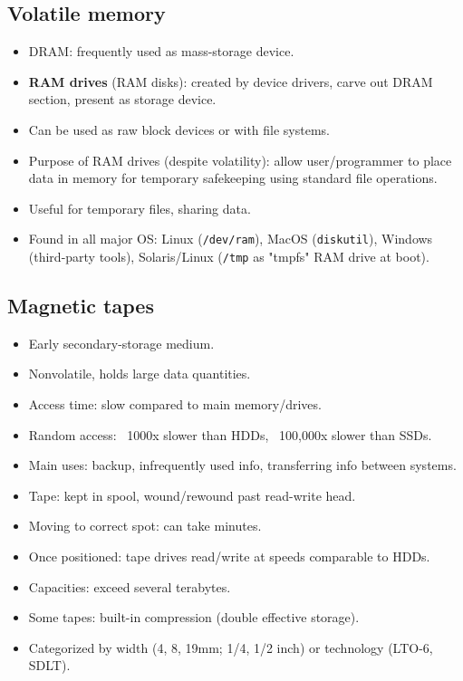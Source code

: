 \subsection{Volatile memory}
\begin{itemize}
    \item DRAM: frequently used as mass-storage device.
    \item \textbf{RAM drives} (RAM disks): created by device drivers, carve out DRAM section, present as storage device.
    \item Can be used as raw block devices or with file systems.
    \item Purpose of RAM drives (despite volatility): allow user/programmer to place data in memory for temporary safekeeping using standard file operations.
    \item Useful for temporary files, sharing data.
    \item Found in all major OS: Linux (\texttt{/dev/ram}), MacOS (\texttt{diskutil}), Windows (third-party tools), Solaris/Linux (\texttt{/tmp} as "tmpfs" RAM drive at boot).
\end{itemize}

\subsection{Magnetic tapes}
\begin{itemize}
    \item Early secondary-storage medium.
    \item Nonvolatile, holds large data quantities.
    \item Access time: slow compared to main memory/drives.
    \item Random access: ~1000x slower than HDDs, ~100,000x slower than SSDs.
    \item Main uses: backup, infrequently used info, transferring info between systems.
    \item Tape: kept in spool, wound/rewound past read-write head.
    \item Moving to correct spot: can take minutes.
    \item Once positioned: tape drives read/write at speeds comparable to HDDs.
    \item Capacities: exceed several terabytes.
    \item Some tapes: built-in compression (double effective storage).
    \item Categorized by width (4, 8, 19mm; 1/4, 1/2 inch) or technology (LTO-6, SDLT).
\end{itemize}

